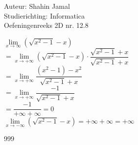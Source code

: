 \documentclass[a4paper]{article}
\begin{document}
  
\noindent \large Auteur: Shahin Jamal \\
\noindent \large Studierichting: Informatica\\
\noindent \large Oefeningenreeks 2D nr. 12.8\\

\medskip

\normalsize


$\lim\limits_{x \rightarrow \infty} (\sqrt{x^2-1} - x)$\\ 

$= \lim\limits_{x \rightarrow +\infty} (\sqrt{x^2-1} - x) \cdot \dfrac{\sqrt{x^2-1} + x}{\sqrt{x^2-1} + x}$ \\

$= \lim\limits_{x \rightarrow +\infty} \dfrac{(x^2-1) - x^2}{\sqrt{x^2-1} + x}$ \\

$= \lim\limits_{x \rightarrow +\infty} \dfrac{-1}{\sqrt{x^2-1} + x}$ \\

$= \dfrac{-1}{+\infty + \infty} = 0$\\

$\lim\limits_{x \rightarrow -\infty} (\sqrt{x^2-1} - x) = +\infty + \infty = +\infty$\\

\begin{thebibliography}{999}
\end{thebibliography}
\end{document}
